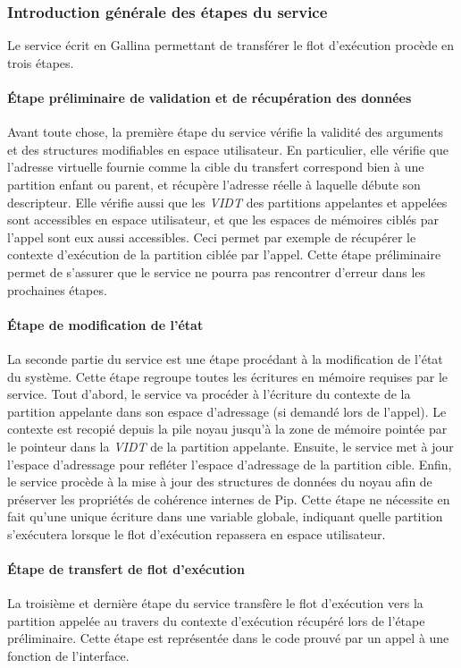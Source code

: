 			\subsubsection{Introduction générale des étapes du service}

			Le service écrit en Gallina permettant de transférer le flot d'exécution procède en trois étapes.

			\paragraph{Étape préliminaire de validation et de récupération des données} Avant toute chose, la première étape du service vérifie la validité des arguments et des structures modifiables en espace utilisateur. En particulier, elle vérifie que l'adresse virtuelle fournie comme la cible du transfert correspond bien à une partition enfant ou parent, et récupère l'adresse réelle à laquelle débute son descripteur. Elle vérifie aussi que les \emph{VIDT} des partitions appelantes et appelées sont accessibles en espace utilisateur, et que les espaces de mémoires ciblés par l'appel sont eux aussi accessibles. Ceci permet par exemple de récupérer le contexte d'exécution de la partition ciblée par l'appel. Cette étape préliminaire permet de s'assurer que le service ne pourra pas rencontrer d'erreur dans les prochaines étapes.

			\paragraph{Étape de modification de l'état} La seconde partie du service est une étape procédant à la modification de l'état du système. Cette étape regroupe toutes les écritures en mémoire requises par le service. Tout d'abord, le service va procéder à l'écriture du contexte de la partition appelante dans son espace d'adressage (si demandé lors de l'appel). Le contexte est recopié depuis la pile noyau jusqu'à la zone de mémoire pointée par le pointeur dans la \emph{VIDT} de la partition appelante.
			Ensuite, le service met à jour l'espace d'adressage pour refléter l'espace d'adressage de la partition cible.
			Enfin, le service procède à la mise à jour des structures de données du noyau afin de préserver les propriétés de cohérence internes de Pip. Cette étape ne nécessite en fait qu'une unique écriture dans une variable globale, indiquant quelle partition s'exécutera lorsque le flot d'exécution repassera en espace utilisateur.

			\paragraph{Étape de transfert de flot d'exécution} La troisième et dernière étape du service transfère le flot d'exécution vers la partition appelée au travers du contexte d'exécution récupéré lors de l'étape préliminaire. Cette étape est représentée dans le code prouvé par un appel à une fonction de l'interface.

